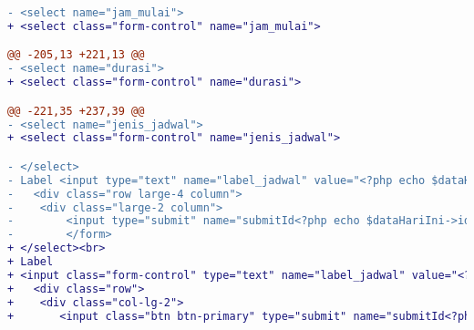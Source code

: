 \begin{lstlisting}[language=diff, caption=Kode untuk Halaman Entri Jadwal Dosen,  basicstyle=\ttfamily, frame=single,
columns=fullflexible, keepspaces=true, breaklines=true, label={lst:mainEntriJadwalDosen}]
- <select name="jam_mulai"> 
+ <select class="form-control" name="jam_mulai">

@@ -205,13 +221,13 @@
- <select name="durasi"> 
+ <select class="form-control" name="durasi">

@@ -221,35 +237,39 @@
- <select name="jenis_jadwal"> 
+ <select class="form-control" name="jenis_jadwal">

- </select>
- Label <input type="text" name="label_jadwal" value="<?php echo $dataHariIni->label; ?>"><br> 
-   <div class="row large-4 column">
-    <div class="large-2 column">
-        <input type="submit" name="submitId<?php echo $dataHariIni->id ?>" class="button" value="Save  ">
-        </form>
+ </select><br>
+ Label
+ <input class="form-control" type="text" name="label_jadwal" value="<?php echo $dataHariIni->label; ?>"><br>
+   <div class="row">
+    <div class="col-lg-2">
+       <input class="btn btn-primary" type="submit" name="submitId<?php echo $dataHariIni->id ?>" class="button" value="Save  ">
\end{lstlisting}


